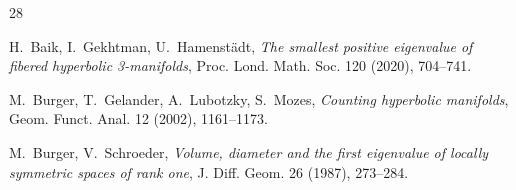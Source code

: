\documentclass[11pt]{amsart}
\theoremstyle{plain}
\theoremstyle{plain}
\theoremstyle{definition}
\begin{document}

 
 
 
 

\begin{thebibliography}{28}


 H.~Baik, I.~Gekhtman, U.~Hamenst\"adt,
{\em The smallest positive eigenvalue of fibered
hyperbolic 3-manifolds}, Proc. Lond. Math. Soc. 120 (2020), 704--741.
















 M.~Burger, T.~Gelander, A.~Lubotzky, S.~Mozes,
{\em Counting hyperbolic manifolds}, Geom. Funct. Anal. 12 (2002), 1161--1173.

 M.~Burger, V.~Schroeder, {\em Volume, diameter
and the first eigenvalue of locally symmetric
spaces of rank one}, J. Diff. Geom. 26 (1987), 273--284.





\end{thebibliography}
\end{document}
